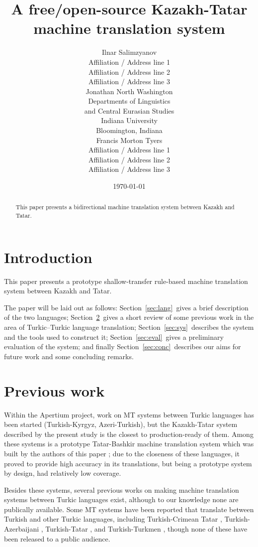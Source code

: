 \documentclass[11pt]{article}
\title{A free/open-source Kazakh-Tatar machine translation system}
\author{Ilnar Salimzyanov\\
  Affiliation / Address line 1\\
  Affiliation / Address line 2\\
  Affiliation / Address line 3\\
  \email{email@domain}  \And
  Jonathan North Washington\\
  Departments of Linguistics\\
  and Central Eurasian Studies\\
  Indiana University\\
  Bloomington, Indiana\\
  \email{jonwashi@indiana.edu}  \And
  Francis Morton Tyers\\
  Affiliation / Address line 1\\
  Affiliation / Address line 2\\
  Affiliation / Address line 3\\
  \email{email@domain}}
\date{\today}
\begin{document}
\maketitle
\begin{abstract}
This paper presents a bidirectional machine translation system between Kazakh and Tatar.
\end{abstract}

\section{Introduction}

This paper presents a prototype shallow-transfer rule-based machine translation
system between Kazakh and Tatar.

The paper will be laid out as follows: Section~\ref{sec:lang}\ gives a brief
description of the two languages; Section~\ref{sec:prev}\ gives a short review
of some previous work in the area of Turkic--Turkic language translation;
Section~\ref{sec:sys}\ describes the system and the tools used to construct it;
Section~\ref{sec:eval}\ gives a preliminary evaluation of the system; and
finally Section~\ref{sec:conc}\ describes our aims for future work and some
concluding remarks.

\section{Previous work}
\label{sec:prev}

Within the Apertium project, work on MT systems between Turkic languages has been started (Turkish-Kyrgyz, Azeri-Turkish), but the Kazakh-Tatar system described by the present study is the closest to production-ready of them.  Among these systems is a prototype Tatar-Bashkir machine translation system which was built by the authors of this paper \citep{tyerswashingtonsalimzyanbattalov12}; due to the closeness of these languages, it proved to provide high accuracy in its translations, but being a prototype system by design, had relatively low coverage.

Besides these systems, several previous works on making machine translation systems between Turkic languages exist, although to our knowledge none are publically available.
Some MT systems have been reported that translate between Turkish and other Turkic languages, including Turkish-Crimean Tatar \citep{altintas01},
Turkish-Azerbaijani \citep{hamzaoglu93}, Turkish-Tatar \citep{suleymanov08}, and
Turkish-Turkmen \citep{tantug07}, though none of these have been released to a public audience.
\end{document}
